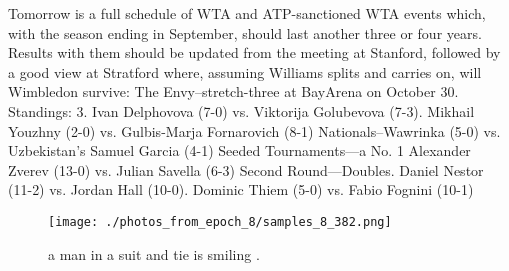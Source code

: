 \documentclass{article}%
\begin{document}
Tomorrow is a full schedule of WTA and ATP{-}sanctioned WTA events which, with the season ending in September, should last another three or four years. Results with them should be updated from the meeting at Stanford, followed by a good view at Stratford where, assuming Williams splits and carries on, will Wimbledon survive:\newline%
The Envy–stretch{-}three at BayArena on October 30.\newline%
Standings: 3. Ivan Delphovova (7{-}0) vs. Viktorija Golubevova (7{-}3). Mikhail Youzhny (2{-}0) vs. Gulbis{-}Marja Fornarovich (8{-}1)\newline%
Nationals–Wawrinka (5{-}0) vs. Uzbekistan’s Samuel Garcia (4{-}1)\newline%
Seeded Tournaments—a\newline%
No. 1 Alexander Zverev (13{-}0) vs. Julian Savella (6{-}3)\newline%
Second Round—Doubles. Daniel Nestor (11{-}2) vs. Jordan Hall (10{-}0). Dominic Thiem (5{-}0) vs. Fabio Fognini (10{-}1)\newline%

%


\begin{figure}[h!]%
\centering%
\texttt{[image: ./photos\_from\_epoch\_8/samples\_8\_382.png]}%
\caption{a man in a suit and tie is smiling .}%
\end{figure}

%
\end{document}
